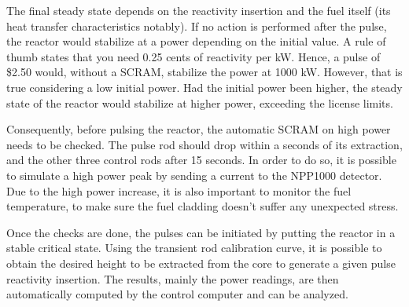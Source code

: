 The final steady state depends on the reactivity insertion and the fuel itself (its heat transfer characteristics notably). If no action is performed after the pulse, the reactor would stabilize at a power depending on the initial value. A rule of thumb states that you need 0.25 cents of reactivity per kW. Hence, a pulse of \$2.50 would, without a SCRAM, stabilize the power at 1000 kW. However, that is true considering a low initial power. Had the initial power been higher, the steady state of the reactor would stabilize at higher power, exceeding the license limits.

Consequently, before pulsing the reactor, the automatic SCRAM on high power needs to be checked. The pulse rod should drop within a seconds of its extraction, and the other three control rods after 15 seconds. In order to do so, it is possible to simulate a high power peak by sending a current to the NPP1000 detector. Due to the high power increase, it is also important to monitor the fuel temperature, to make sure the fuel cladding doesn't suffer any unexpected stress.

Once the checks are done, the pulses can be initiated by putting the reactor in a stable critical state. Using the transient rod calibration curve, it is possible to obtain the desired height to be extracted from the core to generate a given pulse reactivity insertion. The results, mainly the power readings, are then automatically computed by the control computer and can be analyzed.
